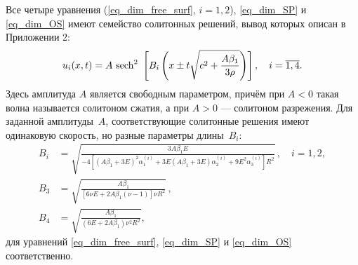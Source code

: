 \documentclass[12pt, a4paper]{report}
\begin{document}
Все четыре уравнения (\ref{eq_dim_free_surf}, $i=1,2$), \eqref{eq_dim_SP} и \eqref{eq_dim_OS} имеют семейство солитонных решений, вывод которых описан в Приложении 2:
\begin{equation}\label{soliton}
u_i(x,t) = A\ {\rm sech}^2\ \left[B_{i} \left(x\pm t \sqrt{c^2+\frac{A \beta_1}{3 \rho}}\right) \right], \quad i = \overline {1,4}.
\end{equation}
Здесь амплитуда $A$ является свободным параметром, причём при $A<0$ такая волна называется солитоном сжатия, а при $A>0$ --- солитоном разрежения. Для заданной амплитуды~$A$, соответствующие солитонные решения имеют одинаковую скорость, но разные параметры длины~$B_i$:
\begin{align}
\label{Bi}
B_i &= \sqrt{\frac{3A\beta_1 E}{-4\left[(A\beta_1 + 3E)^2\alpha_1^{(i)} + 3E(A\beta_1 + 3E)\alpha_2^{(i)} + 9E^2\alpha_3^{(i)}\right] R^2}} \, , \quad i=1,2,\\
\label{B3}
B_3 &= \sqrt{\frac{A\beta_1}{\left[6\nu E + 2 A \beta_1 (\nu - 1)\right] \nu R^2}}\, , \\
\label{B4}
B_4 &= \sqrt{\frac{A\beta_1}{(6E + 2A\beta_1)\nu^2 R^2}},
\end{align}
для уравнений \eqref{eq_dim_free_surf}, \eqref{eq_dim_SP} и \eqref{eq_dim_OS} соответственно.
\end{document}
